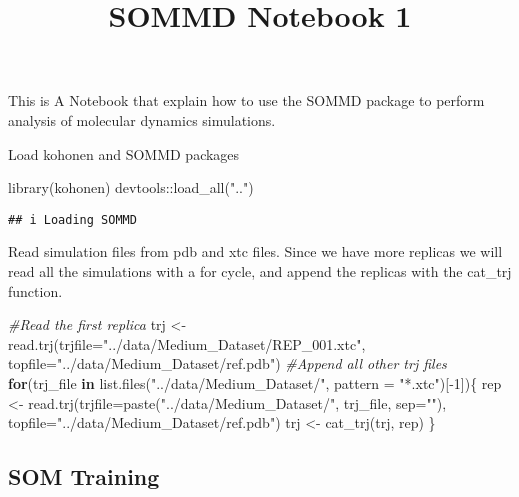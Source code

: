 \documentclass[
]{article}
\title{SOMMD Notebook 1}
\author{}
\date{\vspace{-2.5em}}
\newenvironment{Shaded}{\begin{snugshade}}{\end{snugshade}}
\newcommand{\AttributeTok}[1]{\textcolor[rgb]{0.77,0.63,0.00}{#1}}
\newcommand{\CommentTok}[1]{\textcolor[rgb]{0.56,0.35,0.01}{\textit{#1}}}
\newcommand{\ControlFlowTok}[1]{\textcolor[rgb]{0.13,0.29,0.53}{\textbf{#1}}}
\newcommand{\DecValTok}[1]{\textcolor[rgb]{0.00,0.00,0.81}{#1}}
\newcommand{\FunctionTok}[1]{\textcolor[rgb]{0.00,0.00,0.00}{#1}}
\newcommand{\NormalTok}[1]{#1}
\newcommand{\OtherTok}[1]{\textcolor[rgb]{0.56,0.35,0.01}{#1}}
\newcommand{\SpecialCharTok}[1]{\textcolor[rgb]{0.00,0.00,0.00}{#1}}
\newcommand{\StringTok}[1]{\textcolor[rgb]{0.31,0.60,0.02}{#1}}
\begin{document}
\maketitle

This is A Notebook that explain how to use the SOMMD package to perform
analysis of molecular dynamics simulations.

Load kohonen and SOMMD packages

\begin{Shaded}
\begin{Highlighting}[]
\FunctionTok{library}\NormalTok{(kohonen)}
\NormalTok{devtools}\SpecialCharTok{::}\FunctionTok{load\_all}\NormalTok{(}\StringTok{".."}\NormalTok{)}
\end{Highlighting}
\end{Shaded}

\begin{verbatim}
## i Loading SOMMD
\end{verbatim}

Read simulation files from pdb and xtc files. Since we have more
replicas we will read all the simulations with a for cycle, and append
the replicas with the cat\_trj function.

\begin{Shaded}
\begin{Highlighting}[]
\CommentTok{\#Read the first replica}
\NormalTok{trj }\OtherTok{\textless{}{-}} \FunctionTok{read.trj}\NormalTok{(}\AttributeTok{trjfile=}\StringTok{"../data/Medium\_Dataset/REP\_001.xtc"}\NormalTok{, }\AttributeTok{topfile=}\StringTok{"../data/Medium\_Dataset/ref.pdb"}\NormalTok{)}
\CommentTok{\#Append all other trj files}
\ControlFlowTok{for}\NormalTok{(trj\_file }\ControlFlowTok{in} \FunctionTok{list.files}\NormalTok{(}\StringTok{"../data/Medium\_Dataset/"}\NormalTok{, }\AttributeTok{pattern =} \StringTok{"*.xtc"}\NormalTok{)[}\SpecialCharTok{{-}}\DecValTok{1}\NormalTok{])\{}
\NormalTok{  rep }\OtherTok{\textless{}{-}} \FunctionTok{read.trj}\NormalTok{(}\AttributeTok{trjfile=}\FunctionTok{paste}\NormalTok{(}\StringTok{"../data/Medium\_Dataset/"}\NormalTok{, trj\_file, }\AttributeTok{sep=}\StringTok{""}\NormalTok{), }
                  \AttributeTok{topfile=}\StringTok{"../data/Medium\_Dataset/ref.pdb"}\NormalTok{)}
\NormalTok{  trj }\OtherTok{\textless{}{-}} \FunctionTok{cat\_trj}\NormalTok{(trj, rep)}
\NormalTok{\}}
\end{Highlighting}
\end{Shaded}

\hypertarget{som-training}{%
\subsection{SOM Training}\label{som-training}}
\end{document}
